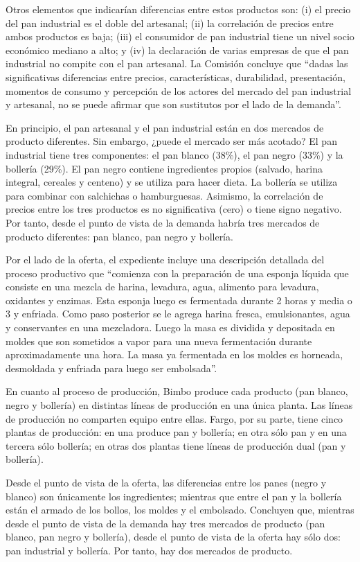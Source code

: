 \documentclass[
  12pt,
  spanish,
]{book}
\begin{document}
Otros elementos que indicarían diferencias entre estos productos son:
(i) el precio del pan industrial es el doble del artesanal; (ii) la
correlación de precios entre ambos productos es baja; (iii) el
consumidor de pan industrial tiene un nivel socio económico mediano a
alto; y (iv) la declaración de varias empresas de que el pan industrial
no compite con el pan artesanal. La Comisión concluye que ``dadas las
significativas diferencias entre precios, características, durabilidad,
presentación, momentos de consumo y percepción de los actores del
mercado del pan industrial y artesanal, no se puede afirmar que son
sustitutos por el lado de la demanda''.

En principio, el pan artesanal y el pan industrial están en dos mercados
de producto diferentes. Sin embargo, ¿puede el mercado ser más acotado?
El pan industrial tiene tres componentes: el pan blanco (38\%), el pan
negro (33\%) y la bollería (29\%). El pan negro contiene ingredientes
propios (salvado, harina integral, cereales y centeno) y se utiliza para
hacer dieta. La bollería se utiliza para combinar con salchichas o
hamburguesas. Asimismo, la correlación de precios entre los tres
productos es no significativa (cero) o tiene signo negativo. Por tanto,
desde el punto de vista de la demanda habría tres mercados de producto
diferentes: pan blanco, pan negro y bollería.

Por el lado de la oferta, el expediente incluye una descripción
detallada del proceso productivo que ``comienza con la preparación de
una esponja líquida que consiste en una mezcla de harina, levadura,
agua, alimento para levadura, oxidantes y enzimas. Esta esponja luego es
fermentada durante 2 horas y media o 3 y enfriada. Como paso posterior
se le agrega harina fresca, emulsionantes, agua y conservantes en una
mezcladora. Luego la masa es dividida y depositada en moldes que son
sometidos a vapor para una nueva fermentación durante aproximadamente
una hora. La masa ya fermentada en los moldes es horneada, desmoldada y
enfriada para luego ser embolsada''.

En cuanto al proceso de producción, Bimbo produce cada producto (pan
blanco, negro y bollería) en distintas líneas de producción en una única
planta. Las líneas de producción no comparten equipo entre ellas. Fargo,
por su parte, tiene cinco plantas de producción: en una produce pan y
bollería; en otra sólo pan y en una tercera sólo bollería; en otras dos
plantas tiene líneas de producción dual (pan y bollería).

Desde el punto de vista de la oferta, las diferencias entre los panes
(negro y blanco) son únicamente los ingredientes; mientras que entre el
pan y la bollería están el armado de los bollos, los moldes y el
embolsado. Concluyen que, mientras desde el punto de vista de la demanda
hay tres mercados de producto (pan blanco, pan negro y bollería), desde
el punto de vista de la oferta hay sólo dos: pan industrial y bollería.
Por tanto, hay dos mercados de producto.
\end{document}
